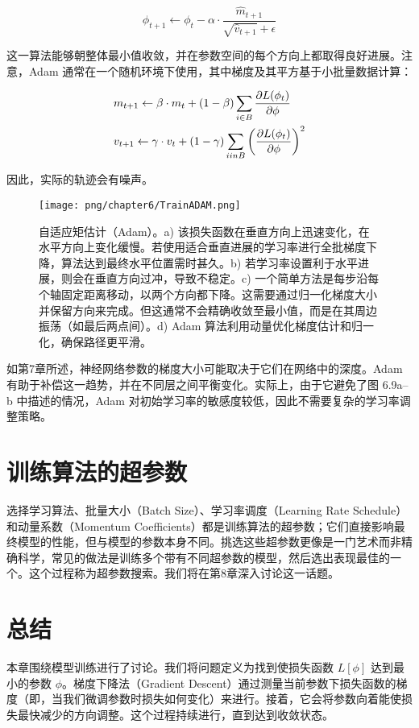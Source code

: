 \begin{equation}
\phi_{t+1} \leftarrow \phi_t - \alpha \cdot \frac{\hat{m}_{t+1}}{\sqrt{\hat{v}_{t+1}} + \epsilon} 
\end{equation}

这一算法能够朝整体最小值收敛，并在参数空间的每个方向上都取得良好进展。注意，Adam 通常在一个随机环境下使用，其中梯度及其平方基于小批量数据计算：

\begin{align}
&m_{t+1} \leftarrow \beta \cdot m_t + (1 - \beta) \sum_{i \in B} \frac{\partial L(\phi_t)}{\partial \phi} \notag \\
&v_{t+1} \leftarrow \gamma \cdot v_t + (1 - \gamma) \sum_{i in B} \left( \frac{\partial L(\phi_t)}{\partial \phi} \right)^2 
\end{align}

因此，实际的轨迹会有噪声。

\begin{figure}[ht!]
\centering
\texttt{[image: png/chapter6/TrainADAM.png]}
\caption{自适应矩估计（Adam）。a) 该损失函数在垂直方向上迅速变化，在水平方向上变化缓慢。若使用适合垂直进展的学习率进行全批梯度下降，算法达到最终水平位置需时甚久。b) 若学习率设置利于水平进展，则会在垂直方向过冲，导致不稳定。c) 一个简单方法是每步沿每个轴固定距离移动，以两个方向都下降。这需要通过归一化梯度大小并保留方向来完成。但这通常不会精确收敛至最小值，而是在其周边振荡（如最后两点间）。d) Adam 算法利用动量优化梯度估计和归一化，确保路径更平滑。}
\end{figure}

如第7章所述，神经网络参数的梯度大小可能取决于它们在网络中的深度。Adam 有助于补偿这一趋势，并在不同层之间平衡变化。实际上，由于它避免了图 6.9a–b 中描述的情况，Adam 对初始学习率的敏感度较低，因此不需要复杂的学习率调整策略。

\section{训练算法的超参数}
选择学习算法、批量大小（Batch Size）、学习率调度（Learning Rate Schedule）和动量系数（Momentum Coefficients）都是训练算法的超参数；它们直接影响最终模型的性能，但与模型的参数本身不同。挑选这些超参数更像是一门艺术而非精确科学，常见的做法是训练多个带有不同超参数的模型，然后选出表现最佳的一个。这个过程称为超参数搜索。我们将在第8章深入讨论这一话题。

\section{总结}
本章围绕模型训练进行了讨论。我们将问题定义为找到使损失函数 \(L[\phi]\) 达到最小的参数 \(\phi\)。梯度下降法（Gradient Descent）通过测量当前参数下损失函数的梯度（即，当我们微调参数时损失如何变化）来进行。接着，它会将参数向着能使损失最快减少的方向调整。这个过程持续进行，直到达到收敛状态。

